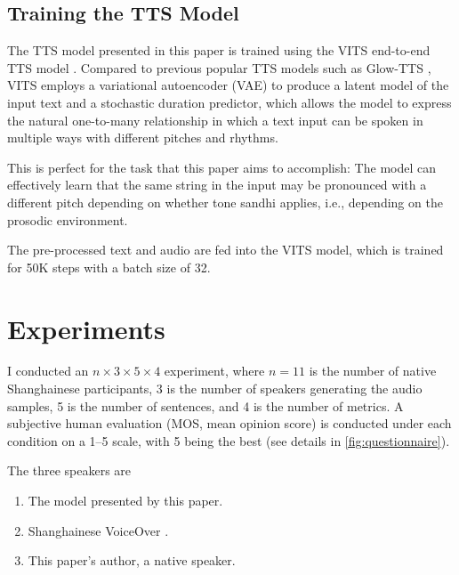 \documentclass[11pt]{article}
\begin{document}
\subsection{Training the TTS Model}
The TTS model presented in this paper is trained using the VITS end-to-end TTS model \citep{kimConditionalVariationalAutoencoder2021}.
Compared to previous popular TTS models such as Glow-TTS \citep{kimGlowTTSGenerativeFlow2020}, VITS employs a variational autoencoder (VAE) to produce a latent model of the input text and a stochastic duration predictor, which allows the model to  express the natural one-to-many relationship in which a text input can be spoken in multiple ways with different pitches and rhythms.

This is perfect for the task that this paper aims to accomplish: The model can effectively learn that the same string in the input may be pronounced with a different pitch depending on whether tone sandhi applies, i.e., depending on the prosodic environment.

The pre-processed text and audio are fed into the VITS model, which is trained for 50K steps with a batch size of 32.

\section{Experiments}
I conducted an $n \times 3 \times 5 \times 4$ experiment, where $n=11$ is the number of native Shanghainese participants, 3 is the number of speakers generating the audio samples, 5 is the number of sentences, and 4 is the number of metrics. A subjective human evaluation (MOS, mean opinion score) is conducted under each condition on a 1--5 scale, with 5 being the best (see details in \cref{fig:questionnaire}).

The three speakers are
\begin{enumerate}
    \item The model presented by this paper.
    \item Shanghainese VoiceOver \citep{VoiceOver}.
    \item This paper's author, a native speaker.
\end{enumerate}

\end{document}
